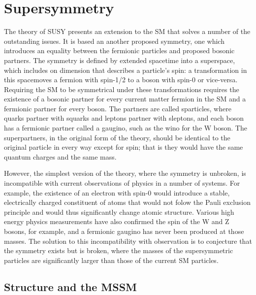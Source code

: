 \chapter{Supersymmetry}

\label{ch:supersymmetry}

The theory of \ac{SUSY} presents an extension to the \ac{SM} that solves a number of the outstanding issues. 
It is based an another proposed symmetry, one which introduces an equality between the fermionic particles and proposed bosonic partners.
The symmetry is defined by extended spacetime into a superspace, which includes on dimension that describes a particle's spin: a transformation in this spacemoves a fermion with spin-1/2 to a boson with spin-0 or vice-versa.
Requiring the \ac{SM} to be symmetrical under these transformations requires the existence of a bosonic partner for every current matter fermion in the \ac{SM} and a fermionic partner for every boson. 
The partners are called sparticles, where quarks partner with squarks and leptons partner with sleptons, and each boson has a fermionic partner called a gaugino, such as the wino for the W boson.
The superpartners, in the original form of the theory, should be identical to the original particle in every way except for spin; that is they would have the same quantum charges and the same mass.

However, the simplest version of the theory, where the symmetry is unbroken, is incompatible with current observations of physics in a number of systems.
For example, the existence of an electron with spin-0 would introduce a stable, electrically charged constituent of atoms that would not folow the Pauli exclusion principle and would thus significantly change atomic structure.
Various high energy physics measurements have also confirmed the spin of the W and Z bosons, for example, and a fermionic gaugino has never been produced at those masses.
The solution to this incompatibility with observation is to conjecture that the symmetry exists but is broken, where the masses of the supersymmetric particles are significantly larger than those of the current \ac{SM} particles. 


\section{Structure and the MSSM}

